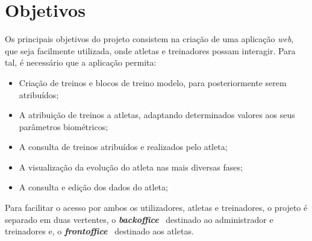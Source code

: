 \section{Objetivos}

Os principais objetivos do projeto consistem na criação de uma aplicação \textit{web}, que seja facilmente utilizada, onde atletas e treinadores possam interagir. Para tal, é necessário que a aplicação permita:

\begin{itemize}
	\item Criação de treinos e blocos de treino modelo, para posteriormente serem atribuídos;
	\item A atribuição de treinos a atletas, adaptando determinados valores aos seus parâmetros biométricos;
	\item A consulta de treinos atribuídos e realizados pelo atleta;
	\item A visualização da evolução do atleta nas mais diversas fases;
	\item A consulta e edição dos dados do atleta;
\end{itemize}

Para facilitar o acesso por ambos os utilizadores, atletas e treinadores, o projeto é separado em duas vertentes, o \textit{\textbf{backoffice}} \textemdash~destinado ao administrador e treinadores e, o \textbf{\textit{frontoffice}} \textemdash~destinado aos atletas.
